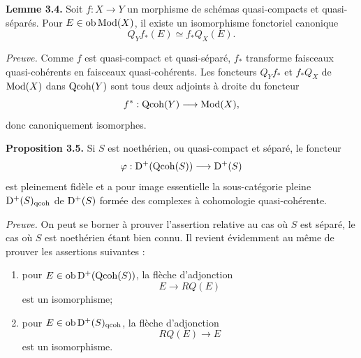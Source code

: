 \documentclass[11pt]{article}
\begin{document}
\textbf{Lemme 3.4.} Soit $f:X\to Y$ un morphisme de schémas quasi-compacts et quasi-séparés. Pour $E\in\operatorname{ob}\operatorname{Mod}(X)$, il existe un isomorphisme fonctoriel canonique
\[
Q_Y f_*(E)\simeq f_*Q_X(E).
\]

\emph{Preuve.} Comme $f$ est quasi-compact et quasi-séparé, $f_*$ transforme faisceaux quasi-cohérents en faisceaux quasi-cohérents. Les foncteurs $Q_Y f_*$ et $f_*Q_X$ de $\operatorname{Mod}(X)$ dans $\operatorname{Qcoh}(Y)$ sont tous deux adjoints à droite du foncteur
\[
f^*:\operatorname{Qcoh}(Y)\longrightarrow\operatorname{Mod}(X),
\]
donc canoniquement isomorphes.

\textbf{Proposition 3.5.} Si $S$ est noethérien, ou quasi-compact et séparé, le foncteur
\[
\varphi:\mathrm D^+(\operatorname{Qcoh}(S))\longrightarrow\mathrm D^+(S)
\]
est pleinement fidèle et a pour image essentielle la sous-catégorie pleine $\mathrm D^+(S)_{\mathrm{qcoh}}$ de $\mathrm D^+(S)$ formée des complexes à cohomologie quasi-cohérente.

\emph{Preuve.} On peut se borner à prouver l'assertion relative au cas où $S$ est séparé, le cas où $S$ est noethérien étant bien connu. Il revient évidemment au même de prouver les assertions suivantes :
\begin{enumerate}[label=(3.5.\arabic*)]
\item pour $E\in\operatorname{ob}\mathrm D^+(\operatorname{Qcoh}(S))$, la flèche d'adjonction
\[
E\longrightarrow RQ(E)
\]
est un isomorphisme;
\item pour $E\in\operatorname{ob}\mathrm D^+(S)_{\mathrm{qcoh}}$, la flèche d'adjonction
\[
RQ(E)\longrightarrow E
\]
est un isomorphisme.
\end{enumerate}
\end{document}
